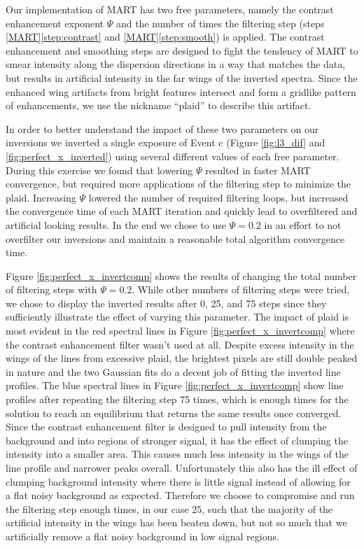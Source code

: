 	
    Our implementation of MART has two free parameters, namely the contrast enhancement exponent $\Psi$ and the number of times the filtering step (steps \ref{MART}\ref{step:contrast} and \ref{MART}\ref{step:smooth}) is applied.
    The contrast enhancement and smoothing steps are designed to fight the tendency of MART to smear intensity along the dispersion directions in a way that matches the data, but results in artificial intensity in the far wings of the inverted spectra.
	Since the enhanced wing artifacts from bright features intersect and form a gridlike pattern of enhancements, we use the nickname ``plaid'' to describe
	this artifact.

    In order to better understand the impact of these two parameters on our inversions we inverted a single exposure of Event c (Figure \ref{fig:l3_dif} and \ref{fig:perfect_x_inverted}) using several different values of each free parameter.
    During this exercise we found that lowering $\Psi$ resulted in faster MART convergence, but required more applications of the filtering step to minimize the plaid.
    Increasing $\Psi$ lowered the number of required filtering loops, but increased the convergence time of each MART iteration and quickly lead to overfiltered and artificial looking results.
    In the end we chose to use $\Psi=0.2$ in an effort to not overfilter our inversions and maintain a reasonable total algorithm convergence time.   
    
    Figure \ref{fig:perfect_x_invertcomp} shows the results of changing the total number of filtering steps with $\Psi=0.2$.
    While other numbers of filtering steps were tried, we chose to display the inverted results after 0, 25, and 75 steps since they sufficiently illustrate the effect of varying this parameter. 
	The impact of plaid is most evident in the red spectral lines in Figure \ref{fig:perfect_x_invertcomp} where the contrast enhancement filter wasn't used at all.
	Despite excess intensity in the wings of the lines from excessive plaid, the brightest pixels are still double peaked in nature and the two Gaussian fits do a decent job of fitting the inverted line profiles.
	The blue spectral lines in Figure \ref{fig:perfect_x_invertcomp} show line profiles after repeating the filtering step 75 times, which is enough times for the solution to reach an equilibrium that returns the same results once converged.
	Since the contrast enhancement filter is designed to pull intensity from the background and into regions of stronger signal, it has the effect of clumping the intensity into a smaller area.
	This causes much less intensity in the wings of the line profile and narrower peaks overall.  
	Unfortunately this also has the ill effect of clumping background intensity where there is little signal instead of allowing for a flat noisy background as expected.  
	Therefore we choose to compromise and run the filtering step enough times, in our case 25, such that the majority of the artificial intensity in the wings has been beaten down, but not so much that we artificially remove a flat noisy background in low signal regions.
	
